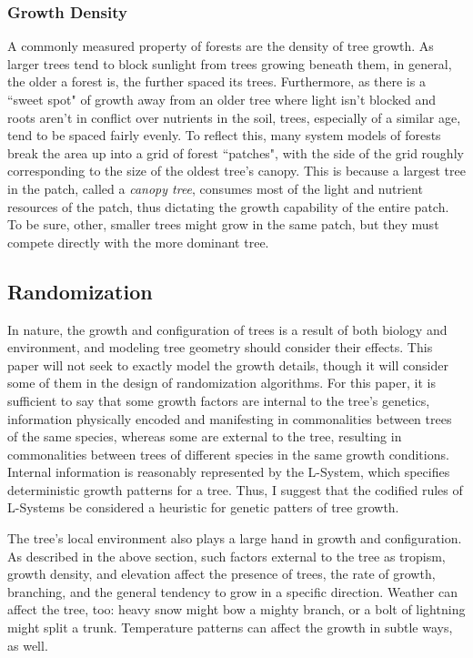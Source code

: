 \documentclass{article}
\newcommand{\tab}{\hspace*{2em}}
\begin{document}
            \subsubsection{Growth Density}
    \tab A commonly measured property of forests are the density of tree growth. As larger trees
tend to block sunlight from trees growing beneath them, in general, the older a forest is, the
further spaced its trees. Furthermore, as there is a ``sweet spot" of growth away from an older
tree where light isn't blocked and roots aren't in conflict over nutrients in the soil, trees,
especially of a similar age, tend to be spaced fairly evenly. To reflect this, many system models
of forests break the area up into a grid of forest ``patches", with the side of the grid roughly
corresponding to the size of the oldest tree's canopy\cite{moorcroft01}. This is because a largest
tree in the patch, called a \emph{canopy tree}, consumes most of the light and nutrient resources
of the patch, thus dictating the growth capability of the entire patch. To be sure, other, smaller
trees might grow in the same patch, but they must compete directly with the more dominant tree.


        \subsection{Randomization}
    \tab In nature, the growth and configuration of trees is a result of both biology and
environment, and modeling tree geometry should consider their effects. This paper will not seek to
exactly model the growth details, though it will consider some of them in the design of
randomization algorithms. For this paper, it is sufficient to say that some growth factors are
internal to the tree's genetics, information physically encoded and manifesting in commonalities
between trees of the same species, whereas some are external to the tree, resulting in
commonalities between trees of different species in the same growth conditions\cite{hlt-rmyb}.
Internal information is reasonably represented by the L-System, which specifies deterministic
growth patterns for a tree. Thus, I suggest that the codified rules of L-Systems be considered a
heuristic for genetic patters of tree growth.

    \tab The tree's local environment also plays a large hand in growth and configuration. As
described in the above section, such factors external to the tree as tropism, growth density, and
elevation affect the presence of trees, the rate of growth, branching, and the general tendency
to grow in a specific direction. Weather can affect the tree, too: heavy snow might bow a mighty
branch, or a bolt of lightning might split a trunk. Temperature patterns can affect the growth in
subtle ways, as well.
\end{document}
